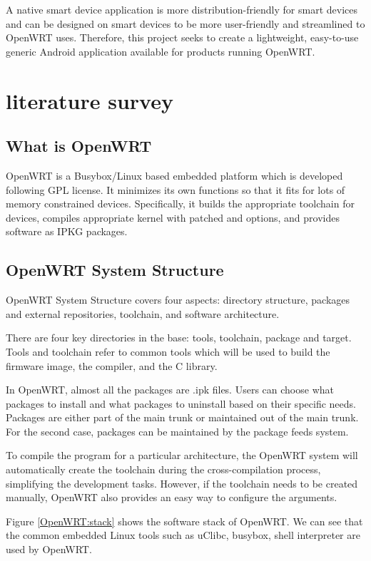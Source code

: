 \documentclass{sig-alternate-05-2015}
\begin{document}
	A native smart device application is more distribution-friendly for smart devices and can be designed on smart devices to be more user-friendly and streamlined to OpenWRT uses. Therefore, this project seeks to create a lightweight, easy-to-use generic Android application available for products running OpenWRT.
	
	\section{literature survey}
	
	\subsection{What is OpenWRT}
	OpenWRT \cite{fainelli2008OpenWRT, kim2014implementation} is a Busybox/Linux based embedded platform which is developed following GPL license. It minimizes its own functions so that it fits for lots of memory constrained devices. Specifically, it builds the appropriate toolchain for devices, compiles appropriate kernel with patched and options, and provides software as IPKG packages.
	
	\subsection{OpenWRT System Structure}
	OpenWRT System Structure covers four aspects: directory structure, packages and external repositories, toolchain, and software architecture.
	
	There are four key directories in the base: tools, toolchain, package and target.
	Tools and toolchain refer to common tools which will be used to build the firmware image, the compiler, and the C library.
	
	In OpenWRT, almost all the packages are .ipk files. Users can choose what packages to install and what packages to uninstall based on their specific needs. Packages are either part of the main trunk or maintained out of the main trunk. For the second case, packages can be maintained by the package feeds system.
	
	To compile the program for a particular architecture, the OpenWRT system will automatically create the toolchain during the cross-compilation process, simplifying the development tasks. However, if the toolchain needs to be created manually, OpenWRT also provides an easy way to configure the arguments.
	
	Figure \ref{OpenWRT:stack} shows the software stack of OpenWRT. We can see that the common embedded Linux tools such as uClibc, busybox, shell interpreter are used by OpenWRT.
	
\end{document}

